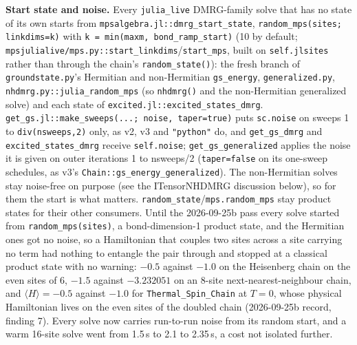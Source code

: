 \documentclass[11pt]{article}
\begin{document}
\textbf{Start state and noise.} Every \texttt{julia\_live} DMRG-family
solve that has no state of its own starts from
\texttt{mpsalgebra.jl::dmrg\_start\_state},
\texttt{random\_mps(sites; linkdims=k)} with
\texttt{k = min(maxm, bond\_ramp\_start)} (10 by default;
\texttt{mpsjulialive/mps.py::start\_linkdims}/\texttt{start\_mps}, built on
\texttt{self.jlsites} rather than through the chain's
\texttt{random\_state()}): the fresh branch of \texttt{groundstate.py}'s
Hermitian and non-Hermitian \texttt{gs\_energy},
\texttt{generalized.py}, \texttt{nhdmrg.py::julia\_random\_mps} (so
\texttt{nhdmrg()} and the non-Hermitian generalized solve) and each state
of \texttt{excited.jl::excited\_states\_dmrg}.
\texttt{get\_gs.jl::make\_sweeps(...; noise, taper=true)} puts
\texttt{sc.noise} on sweeps 1 to \texttt{div(nsweeps,2)} only, as v2, v3
and \texttt{"python"} do, and \texttt{get\_gs\_dmrg} and
\texttt{excited\_states\_dmrg} receive \texttt{self.noise};
\texttt{get\_gs\_generalized} applies the noise it is given on outer
iterations 1 to nsweeps/2 (\texttt{taper=false} on its one-sweep
schedules, as v3's \texttt{Chain::gs\_energy\_generalized}). The
non-Hermitian solves stay noise-free on purpose (see the ITensorNHDMRG
discussion below), so for them the start is what matters.
\texttt{random\_state}/\texttt{mps.random\_mps} stay product states for
their other consumers. Until the 2026-09-25b pass every solve started from
\texttt{random\_mps(sites)}, a bond-dimension-1 product state, and the
Hermitian ones got no noise, so a Hamiltonian that couples two sites
across a site carrying no term had nothing to entangle the pair through
and stopped at a classical product state with no warning: $-0.5$ against
$-1.0$ on the Heisenberg chain on the even sites of 6, $-1.5$ against
$-3.232051$ on an 8-site next-nearest-neighbour chain, and
$\langle H\rangle=-0.5$ against $-1.0$ for \texttt{Thermal\_Spin\_Chain}
at $T=0$, whose physical Hamiltonian lives on the even sites of the
doubled chain (2026-09-25b record, finding 7). Every solve now carries
run-to-run noise from its random start, and a warm 16-site solve went from
1.5\,s to 2.1 to 2.35\,s, a cost not isolated further.
\end{document}
